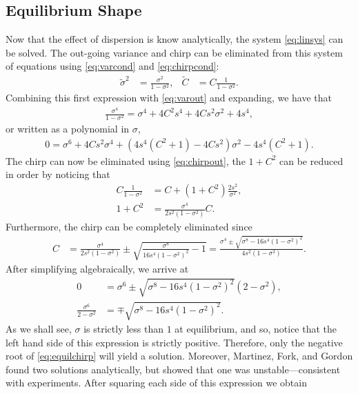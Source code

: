 \subsection{Equilibrium Shape}
Now that the effect of dispersion is know analytically, the system \eqref{eq:linsys} can be solved. The out-going variance and chirp can be eliminated from this system of equations using \eqref{eq:varcond} and \eqref{eq:chirpcond}:
\begin{align*}
\widetilde{\sigma}^2 &= \frac{\sigma^2}{1 - \sigma^2}, & \widetilde{C} &= C \frac{1}{1 - \sigma^2}.
\end{align*}
Combining this first expression with \eqref{eq:varout} and expanding, we have that
\begin{align*}
\frac{\sigma^4}{1 - \sigma^2} = \sigma^4 + 4 C^2 s^4 + 4 C s^2 \sigma^2 + 4s^4,
\end{align*}
or written as a polynomial in $\sigma$,
\begin{align*}
0 = \sigma^6 + 4 C s^2 \sigma^4 + \left( 4s^4 (C^2 + 1) - 4 C s^2 \right) \sigma^2 - 4s^4 (C^2 + 1).
\end{align*}
The chirp can now be eliminated using \eqref{eq:chirpout}, the $1+C^2$ can be reduced in order by noticing that
\begin{align*}
C \frac{1}{1 - \sigma^2} &= C + (1 + C^2) \frac{2s^2}{\sigma^2}, \\
1 + C^2 &= \frac{\sigma^4}{2s^2(1 - \sigma^2)} C.
\end{align*}
Furthermore, the chirp can be completely eliminated since
\begin{align}
\label{eq:equilchirp}
C &= \frac{\sigma^4}{2s^2(1 - \sigma^2)} \pm \sqrt{\frac{\sigma^8}{16s^4(1 - \sigma^2)^2} - 1} = \frac{\sigma^4 \pm \sqrt{\sigma^8 - 16s^4(1 - \sigma^2)^2}}{4s^2(1 - \sigma^2)}.
\end{align}
After simplifying algebraically, we arrive at
\begin{align*}
0 &= \sigma^6 \pm \sqrt{\sigma^8 - 16s^4(1 - \sigma^2)^2}(2 - \sigma^2), \\
\frac{\sigma^6}{2 - \sigma^2} &= \mp \sqrt{\sigma^8 - 16s^4(1 - \sigma^2)^2}.
\end{align*}
As we shall see, $\sigma$ is strictly less than $1$ at equilibrium, and so, notice that the left hand side of this expression is strictly positive. Therefore, only the negative root of \eqref{eq:equilchirp} will yield a solution. Moreover, Martinez, Fork, and Gordon \cite{martinez1984} found two solutions analytically, but showed that one was unstable---consistent with experiments. After squaring each side of this expression we obtain
